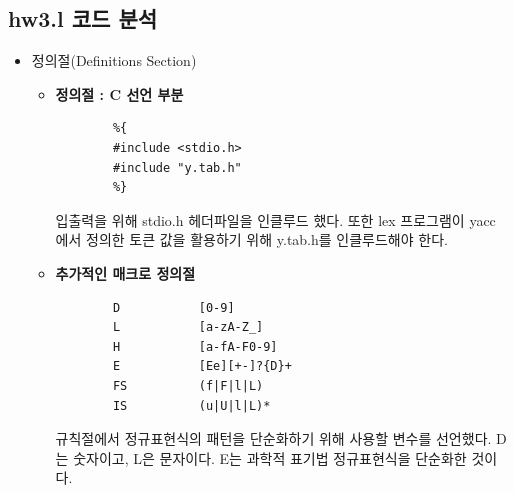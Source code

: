 \documentclass{article}
\begin{document}
\subsection{hw3.l 코드 분석}
\begin{itemize}
	\item 정의절(Definitions Section)	
	\begin{itemize}
		\item {\bf 정의절 : C 선언 부분}
		\begin{lstlisting}
		%{
		#include <stdio.h>
		#include "y.tab.h"
		%}
		\end{lstlisting}
		입출력을 위해 stdio.h 헤더파일을 인클루드 했다.
		또한 lex 프로그램이 yacc 에서 정의한 토큰 값을 활용하기 위해 y.tab.h를 인클루드해야 한다.
		\item {\bf 추가적인 매크로 정의절}
		\begin{lstlisting}
		D			[0-9]
		L			[a-zA-Z_]
		H			[a-fA-F0-9]
		E			[Ee][+-]?{D}+
		FS			(f|F|l|L)
		IS			(u|U|l|L)*
		\end{lstlisting}
		규칙절에서 정규표현식의 패턴을 단순화하기 위해 사용할 변수를 선언했다.
		D는 숫자이고, L은 문자이다. E는 과학적 표기법 정규표현식을 단순화한 것이다.
	\end{itemize}


\end{itemize}
\end{document}
